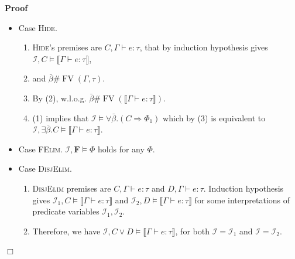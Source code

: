 \documentclass{article}
\newcommand{\assign}{:=}
\newcommand{\tmmathbf}[1]{\ensuremath{\boldsymbol{#1}}}
\newcommand{\tmname}[1]{\textsc{#1}}
\newcommand{\tmop}[1]{\ensuremath{\operatorname{#1}}}
\newenvironment{proof}{\noindent\textbf{Proof\ }}{\hspace*{\fill}$\Box$\medskip}
\begin{document}
\begin{proof}
\begin{itemize}
\begin{enumerate}
      \item and $C \vDash \tau^{\prime} \dot{=} \tau$.
      
      \item Let $\Phi_{\tau} \assign \llbracket \Gamma \vdash e : \tau
      \rrbracket$. Observe, that $\tau$ occurs in $\Phi_{\tau}$ only as a
      subterm in a side of equation: $\dot{=} \tau$, $\dot{=} \ldots
      \rightarrow \tau$, $\dot{=} (\ldots \rightarrow (\ldots \rightarrow
      \tau) \ldots)$. Therefore, $\tau^{\prime} \dot{=} \tau \vDash
      \Phi_{\tau^{\prime}} \Leftrightarrow \Phi_{\tau}$.
      
      \item (1), (2) and (3) imply that $\mathcal{I}, C \vDash \llbracket
      \Gamma \vdash e : \tau \rrbracket$.
    \end{enumerate}
    \item Case {\tmname{Hide}}.
    \begin{enumerate}
      \item {\tmname{Hide}}'s premises are $C, \Gamma \vdash e : \tau$, that
      by induction hypothesis gives $\mathcal{I}, C \vDash \llbracket \Gamma
      \vdash e : \tau \rrbracket$,
      
      \item and $\bar{\beta} \# \tmop{FV} (\Gamma, \tau)$.
      
      \item By (2), w.l.o.g. $\bar{\beta} \# \tmop{FV} (\llbracket \Gamma
      \vdash e : \tau \rrbracket)$.
      
      \item (1) implies that $\mathcal{I} \vDash \forall \bar{\beta} . (C
      \Rightarrow \Phi_1)$ which by (3) is equivalent to $\mathcal{I}, \exists
      \bar{\beta} .C \vDash \llbracket \Gamma \vdash e : \tau \rrbracket$.
    \end{enumerate}
    \item Case {\tmname{FElim}}. $\mathcal{I}, \tmmathbf{F} \vDash \Phi$ holds
    for any $\Phi$.
    
    \item Case {\tmname{DisjElim}}.
    \begin{enumerate}
      \item {\tmname{DisjElim}} premises are $C, \Gamma \vdash e : \tau$ and
      $D, \Gamma \vdash e : \tau$. Induction hypothesis gives $\mathcal{I}_1,
      C \vDash \llbracket \Gamma \vdash e : \tau \rrbracket$ and
      $\mathcal{I}_2, D \vDash \llbracket \Gamma \vdash e : \tau \rrbracket$
      for some interpretations of predicate variables $\mathcal{I}_1,
      \mathcal{I}_2$.
      
      \item Therefore, we have $\mathcal{I}, C \vee D \vDash \llbracket \Gamma
      \vdash e : \tau \rrbracket$, for both $\mathcal{I}=\mathcal{I}_1$ and
      $\mathcal{I}=\mathcal{I}_2$.
    \end{enumerate}
  \end{itemize}
\end{proof}
\end{document}
